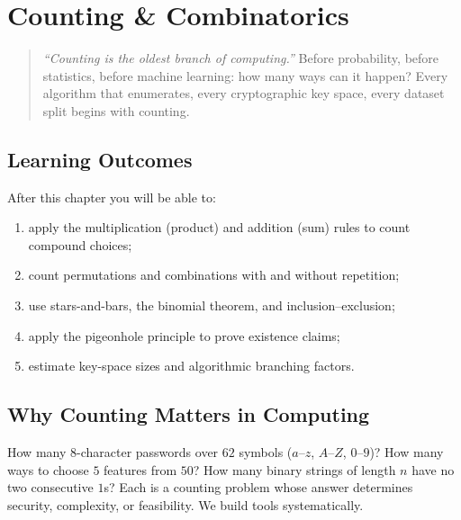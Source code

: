 \chapter{Counting \& Combinatorics}
\label{ch:counting}

\begin{quote}
\emph{``Counting is the oldest branch of computing.''} Before probability, before statistics, before machine learning: how many ways can it happen? Every algorithm that enumerates, every cryptographic key space, every dataset split begins with counting.
\end{quote}

\noindent{}
\vspace{0.4em}

\section*{Learning Outcomes}
After this chapter you will be able to:
\begin{enumerate}[label=(L\arabic*)]
    \item apply the multiplication (product) and addition (sum) rules to count compound choices;
    \item count permutations and combinations with and without repetition;
    \item use stars-and-bars, the binomial theorem, and inclusion--exclusion;
    \item apply the pigeonhole principle to prove existence claims;
    \item estimate key-space sizes and algorithmic branching factors.
\end{enumerate}

\section{Why Counting Matters in Computing}
\label{sec:why-counting}
How many $8$-character passwords over $62$ symbols ($a$--$z$, $A$--$Z$, $0$--$9$)? How many ways to choose $5$ features from $50$? How many binary strings of length $n$ have no two consecutive $1$s? Each is a counting problem whose answer determines security, complexity, or feasibility. We build tools systematically.

